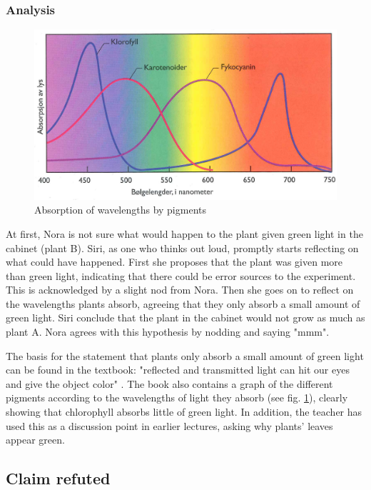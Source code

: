 \subsubsection*{Analysis}
\begin{figure}
\centering
\includegraphics[width=\textwidth]{img/dataandanalasys/absorbtion.png}
\caption{Absorption of wavelengths by pigments \citep{bios}}
\label{fig:absorption}
\end{figure}
At first, Nora is not sure what would happen to the plant given green light in the cabinet (plant B). Siri, as one who thinks out loud, promptly starts reflecting on what could have happened. First she proposes that the plant was given more than green light, indicating that there could be error sources to the experiment. This is acknowledged by a slight nod from Nora. Then she goes on to reflect on the wavelengths plants absorb, agreeing that they only absorb a small amount of green light. Siri conclude that the plant in the cabinet would not grow as much as plant A. Nora agrees with this hypothesis by nodding and saying "mmm". 

The basis for the statement that plants only absorb a small amount of green light can be found in the textbook: "reflected and transmitted light can hit our eyes and give the object color" \citep[pg. 103]{bios}. The book also contains a graph of the different pigments according to the wavelengths of light they absorb (see fig. \ref{fig:absorption}), clearly showing that chlorophyll absorbs little of green light. In addition, the teacher has used this as a discussion point in earlier lectures, asking why plants' leaves appear green. 

\subsection{Claim refuted}

